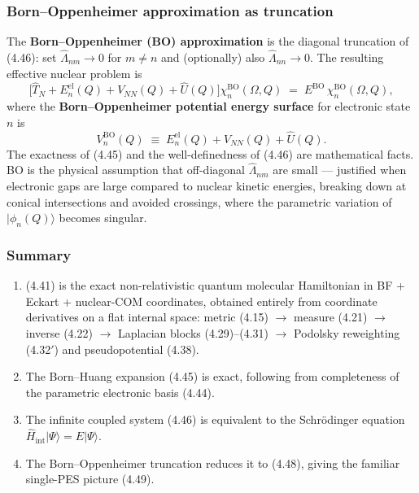 \subsubsection{Born--Oppenheimer approximation as truncation}

The \textbf{Born--Oppenheimer (BO) approximation} is the diagonal truncation of (4.46): set $\hat\Lambda_{nm}\to 0$ for $m\ne n$ and (optionally) also $\hat\Lambda_{nn}\to 0$. The resulting effective nuclear problem is
\begin{equation}
\bigl[\hat T_N + E_n^{\mathrm{el}}(Q) + V_{NN}(Q) + \hat U(Q)\bigr]\chi_n^{\mathrm{BO}}(\Omega,Q) \;=\; E^{\mathrm{BO}}\,\chi_n^{\mathrm{BO}}(\Omega,Q), \tag{4.48}
\end{equation}
where the \textbf{Born--Oppenheimer potential energy surface} for electronic state $n$ is
\begin{equation}
V_n^{\mathrm{BO}}(Q) \;\equiv\; E_n^{\mathrm{el}}(Q) + V_{NN}(Q) + \hat U(Q). \tag{4.49}
\end{equation}
The exactness of (4.45) and the well-definedness of (4.46) are mathematical facts. BO is the physical assumption that off-diagonal $\hat\Lambda_{nm}$ are small --- justified when electronic gaps are large compared to nuclear kinetic energies, breaking down at conical intersections and avoided crossings, where the parametric variation of $|\phi_n(Q)\rangle$ becomes singular.

\subsubsection{Summary}

\begin{enumerate}
\item (4.41) is the exact non-relativistic quantum molecular Hamiltonian in BF + Eckart + nuclear-COM coordinates, obtained entirely from coordinate derivatives on a flat internal space: metric (4.15) $\to$ measure (4.21) $\to$ inverse (4.22) $\to$ Laplacian blocks (4.29)--(4.31) $\to$ Podolsky reweighting (4.32$'$) and pseudopotential (4.38).
\item The Born--Huang expansion (4.45) is exact, following from completeness of the parametric electronic basis (4.44).
\item The infinite coupled system (4.46) is equivalent to the Schr\"odinger equation $\hat H_{\mathrm{int}}|\Psi\rangle = E|\Psi\rangle$.
\item The Born--Oppenheimer truncation reduces it to (4.48), giving the familiar single-PES picture (4.49).
\end{enumerate}
